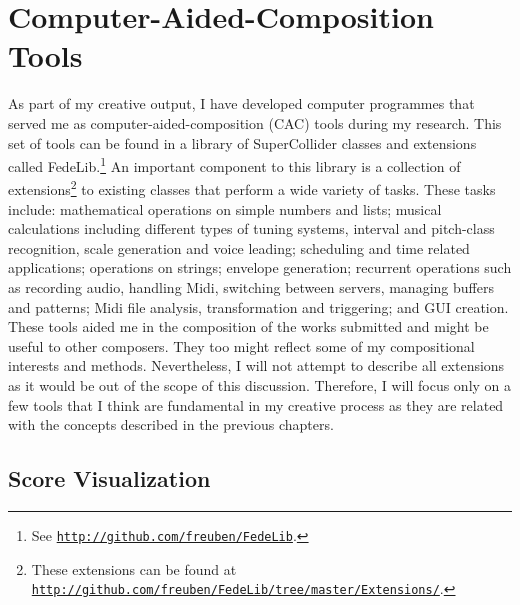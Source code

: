 \section{Computer-Aided-Composition Tools}

As part of my creative output, I have developed computer programmes that served me as computer-aided-composition (CAC) tools during my research. This set of tools can be found in a library of  SuperCollider classes and extensions called FedeLib.\footnote{See \href{http://github.com/freuben/FedeLib}{\texttt{http://github.com/freuben/FedeLib}}.} An important component to this library is a collection of extensions\footnote{These extensions can be found at \href{http://github.com/freuben/FedeLib/tree/master/Extensions/}{\texttt{http://github.com/freuben/FedeLib/tree/master/Extensions/}}.} to existing classes that perform a wide variety of tasks. These tasks include: mathematical operations on simple numbers and lists; musical calculations including different types of tuning systems, interval and pitch-class recognition, scale generation and voice leading; scheduling and time related applications; operations on strings; envelope generation; recurrent operations such as recording audio, handling Midi, switching between servers, managing buffers and patterns; Midi file analysis, transformation and triggering; and GUI creation. These tools aided me in the composition of the works submitted and might be useful to other composers. They too might reflect some of my compositional interests and methods. Nevertheless, I will not attempt to describe all extensions as it would be out of the scope of this discussion. Therefore, I will focus only on a few tools that I think are fundamental in my creative process as they are related with the concepts described in the previous chapters.

\subsection{Score Visualization}
\hypertarget{scorevisual}{}

